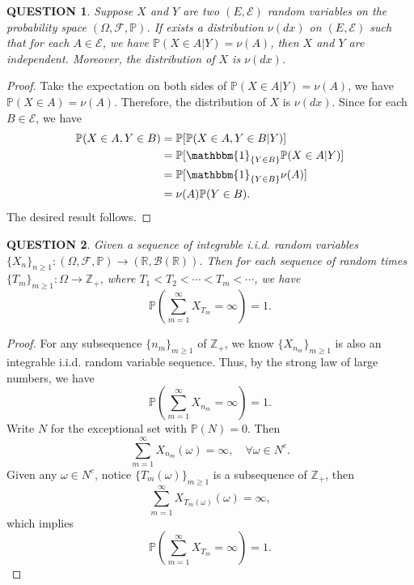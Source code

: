 \documentclass[12pt]{article}
\renewcommand{\b}{\mathscr{B}}
\renewcommand{\(}{\left(}%
\renewcommand{\)}{\right)}%
\renewcommand{\[}{\left[}%
\renewcommand{\]}{\right]}%
\renewcommand{\r}{\mathbb{R}}
\newcommand{\z}{\mathbb{Z}}
\newcommand{\p}{\mathbb{P}}
\newcommand{\f}{\mathscr{F}}
\newcommand{\e}{\mathscr{E}}
\newtheorem{question}{QUESTION}[section]}
\newtheorem{proof}{Proof.}}
\begin{document}
  \begin{question}
   Suppose $X$ and $Y$ are two $(E,\e)$ random variables on the probability space $(\Omega,\f,\p )$. If exists a distribution $\nu(dx)$ on $(E,\e)$ such that for each $A\in\e$, we have $\p(X\in A|Y)=\nu(A)$, then $X$ and $Y$ are independent. Moreover, the distribution of $X$ is $\nu(dx)$.
  \end{question}
  \begin{proof}
   Take the expectation on both sides of $\p(X\in A|Y)=\nu(A)$, we have $\p(X\in A)=\nu(A)$. Therefore, the distribution of $X$ is $\nu(dx)$. Since for each $B\in\e$, we have
   \begin{equation*}
    \begin{split}
     \p(X\in A, Y\in B)&=\p[\p(X\in A, Y\in B|Y)]\\
     &=\p[\mathbbm{1}_{\{Y\in B\}}\p(X\in A|Y)]\\
     &=\p[\mathbbm{1}_{\{Y\in B\}}\nu(A)]\\
     &=\nu(A)\p(Y\in B).
    \end{split}
   \end{equation*}
   The desired result follows.
  \end{proof}

  \begin{question}
   Given a sequence of integrable i.i.d. random variables $\{X_n\}_{n\geq 1}:(\Omega,\f,\p )\to (\r,\b(\r))$. Then for each sequence of random times $\{T_m\}_{m\geq 1}:\Omega \to \z_+$, where $T_1<T_2<\cdots <T_m<\cdots $, we have
   \begin{equation*}
    \p\(\sum_{m=1}^\infty X_{T_m}=\infty\)=1.
   \end{equation*}
  \end{question}
  \begin{proof}
   For any subsequence $\{n_m\}_{m\geq 1}$ of $\z_+$, we know $\{X_{n_m}\}_{m\geq 1}$ is also an integrable i.i.d. random variable sequence. Thus, by the {\sffamily strong law of large numbers}, we have
   \begin{equation*}
    \p\(\sum_{m=1}^\infty X_{n_m}=\infty\)=1.
   \end{equation*}
   Write $N$ for the exceptional set with $\p(N)=0$. Then
   \begin{equation*}
    \sum_{m=1}^\infty X_{n_m}(\omega )=\infty,\quad\forall \omega\in N^c.
   \end{equation*}
    Given any $\omega\in N^c$, notice $\{T_m(\omega )\}_{m\geq 1}$ is a subsequence of $\z_+$, then
   \begin{equation*}
    \sum_{m=1}^\infty X_{T_m(\omega )}(\omega )=\infty,
   \end{equation*}
   which implies
   \begin{equation*}
    \p\(\sum_{m=1}^\infty X_{T_m}=\infty\)=1.
   \end{equation*}
  \end{proof}
\end{document}
